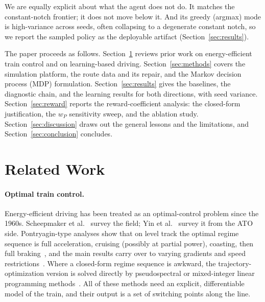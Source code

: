 \documentclass[11pt,a4paper]{article}
\begin{document}
We are equally explicit about what the agent does not do. It matches the
constant-notch frontier; it does not move below it. And its greedy
(argmax) mode is high-variance across seeds, often collapsing to a
degenerate constant notch, so we report the sampled policy as the
deployable artifact (Section~\ref{sec:results}).

The paper proceeds as follows. Section~\ref{sec:related} reviews prior
work on energy-efficient train control and on learning-based driving.
Section~\ref{sec:methods} covers the simulation platform, the route data
and its repair, and the Markov decision process (MDP) formulation.
Section~\ref{sec:results} gives the baselines, the diagnostic chain, and
the learning results for both directions, with seed variance.
Section~\ref{sec:reward} reports the reward-coefficient analysis: the
closed-form justification, the $w_P$ sensitivity sweep, and the ablation
study. Section~\ref{sec:discussion} draws out the general lessons and the
limitations, and Section~\ref{sec:conclusion} concludes.

\section{Related Work}
\label{sec:related}

\paragraph{Optimal train control.} Energy-efficient driving has been
treated as an optimal-control problem since the 1960s. Scheepmaker et
al.~\cite{scheepmaker2017} survey the field; Yin et al.~\cite{yin2017}
survey it from the ATO side. Pontryagin-type analyses show that on level
track the optimal regime sequence is full acceleration, cruising
(possibly at partial power), coasting, then full
braking~\cite{howlett1995,howlett2000,liu2003}, and the main results carry
over to varying gradients and speed
restrictions~\cite{albrecht2016,albrecht2016b}. Where a closed-form regime
sequence is awkward, the trajectory-optimization version is solved directly
by pseudospectral or mixed-integer linear programming
methods~\cite{wang2013}. All of these methods need an explicit,
differentiable model of the train, and their output is a set of switching
points along the line.
\end{document}
